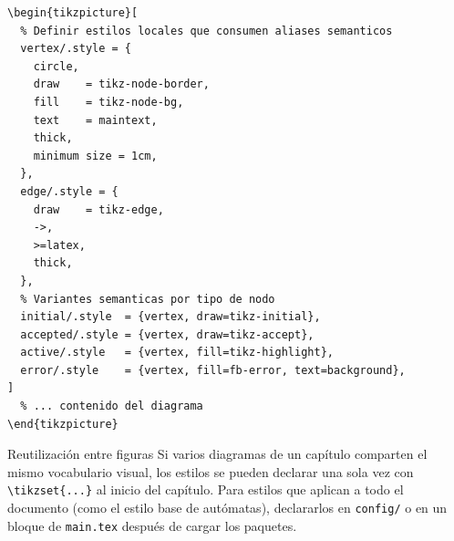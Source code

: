 \begin{lstlisting}[style=latex, frame=none, numbers=none]
\begin{tikzpicture}[
  % Definir estilos locales que consumen aliases semanticos
  vertex/.style = {
    circle,
    draw    = tikz-node-border,
    fill    = tikz-node-bg,
    text    = maintext,
    thick,
    minimum size = 1cm,
  },
  edge/.style = {
    draw    = tikz-edge,
    ->,
    >=latex,
    thick,
  },
  % Variantes semanticas por tipo de nodo
  initial/.style  = {vertex, draw=tikz-initial},
  accepted/.style = {vertex, draw=tikz-accept},
  active/.style   = {vertex, fill=tikz-highlight},
  error/.style    = {vertex, fill=fb-error, text=background},
]
  % ... contenido del diagrama
\end{tikzpicture}
\end{lstlisting}

\begin{observacion}{Reutilización entre figuras}
Si varios diagramas de un capítulo comparten el mismo vocabulario visual,
los estilos se pueden declarar una sola vez con
\texttt{\textbackslash tikzset\{...\}} al inicio del capítulo.
Para estilos que aplican a todo el documento (como el estilo base de
autómatas), declararlos en \texttt{config/} o en un bloque de
\texttt{main.tex} después de cargar los paquetes.
\end{observacion}

\printbibliography[heading=subbibliography]
